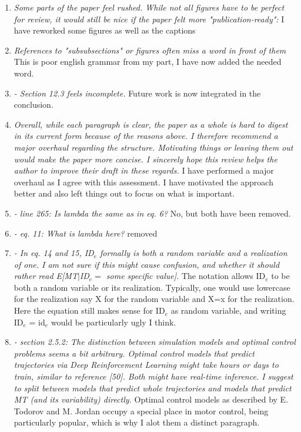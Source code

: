 \documentclass{article}
\begin{document}
\begin{enumerate}
    \item \textit{Some parts of the paper feel rushed. While not all figures have to be perfect for review, it would still be nice if the paper felt more "publication-ready":} I have reworked some figures as well as the captions
    \item \textit{References to "subsubsections" or figures often miss a word in front of them} This is poor english grammar from my part, I have now added the needed word.
    \item \textit{- Section 12.3 feels incomplete.} Future work is now integrated in the conclusion.
    \item \textit{Overall, while each paragraph is clear, the paper as a whole is hard to digest in its current form because of the reasons above. I therefore recommend a major overhaul regarding the structure. Motivating things or leaving them out would make the paper more concise. I sincerely hope this review helps the author to improve their draft in these regards.} I have performed a major overhaul as I agree with this assessment. I have motivated the approach better and also left things out to focus on what is important.
    \item \textit{- line 265: Is lambda the same as in eq. 6?} No, but both have been removed.
    \item \textit{- eq. 11: What is lambda here?} removed
    \item \textit{- In eq. 14 and 15, ID$_e$ formally is both a random variable and a realization of one. I am not sure if this might cause confusion, and whether it should rather read E[MT$\mid$ID$_e=$ some specific value]. } The notation allows ID$_e$ to be both a random variable or its realization. Typically, one would use lowercase for the realization say X for the random variable and X=x for the realization. Here the equation still makes sense for ID$_e$ as random variable, and writing ID$_e$ = id$_e$ would be particularly ugly I think.
    \item \textit{- section 2.5.2: The distinction between simulation models and optimal control problems seems a bit arbitrary. Optimal control models that predict trajectories via Deep Reinforcement Learning might take hours or days to train, similar to reference [50]. Both might have real-time inference. I suggest to split between models that predict whole trajectories and models that predict MT (and its variability) directly. } Optimal control models as described by E. Todorov and M. Jordan occupy a special place in motor control, being particularly popular, which is why I alot them a distinct paragraph.

\end{enumerate}
\end{document}
